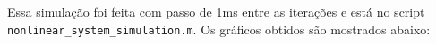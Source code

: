 \documentclass[12pt]{article}
\begin{document}
    Essa simulação foi feita com passo de 1ms entre as iterações e está no script \\
    \texttt{nonlinear\_system\_simulation.m}. Os gráficos obtidos são mostrados abaixo:
    \begin{figure}[H]
         \qquad
         \par       

\end{figure}
\end{document}
